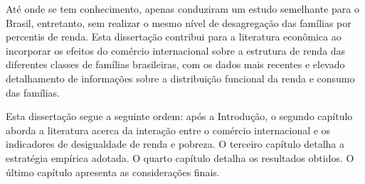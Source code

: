 Até onde se tem conhecimento, apenas \textcite{carneiro06, ferreira06} conduziram um estudo semelhante para o Brasil, entretanto, sem realizar o mesmo nível de desagregação das famílias por percentis de renda. Esta dissertação contribui para a literatura econômica ao incorporar os efeitos do comércio internacional sobre a estrutura de renda das diferentes classes de famílias brasileiras, com os dados mais recentes e elevado detalhamento de informações sobre a distribuição funcional da renda e consumo das famílias.

Esta dissertação segue a seguinte ordem: após a Introdução, o segundo capítulo aborda a literatura acerca da interação entre o comércio internacional e os indicadores de desigualdade de renda e pobreza. O terceiro capítulo detalha a estratégia empírica adotada. O quarto capítulo detalha os resultados obtidos. O último capítulo apresenta as considerações finais.


